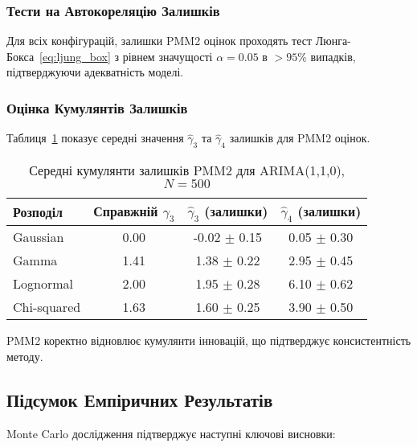\documentclass[12pt,a4paper]{article}
\begin{document}
	\subsubsection{Тести на Автокореляцію Залишків}
	
	Для всіх конфігурацій, залишки PMM2 оцінок проходять тест Люнга-Бокса~\eqref{eq:ljung_box} з рівнем значущості $\alpha = 0.05$ в $> 95\%$ випадків, підтверджуючи адекватність моделі.
	
	\subsubsection{Оцінка Кумулянтів Залишків}
	
	Таблиця~\ref{tab:residual_cumulants} показує середні значення $\hat{\gamma}_3$ та $\hat{\gamma}_4$ залишків для PMM2 оцінок.
	
	\begin{table}[h]
		\centering
		\caption{Середні кумулянти залишків PMM2 для ARIMA(1,1,0), $N=500$}
		\label{tab:residual_cumulants}
		\begin{tabular}{@{}lccc@{}}
			\toprule
			\textbf{Розподіл} & \textbf{Справжній $\gamma_3$} & \textbf{$\hat{\gamma}_3$ (залишки)} & \textbf{$\hat{\gamma}_4$ (залишки)} \\
			\midrule
			Gaussian    & 0.00 & -0.02 $\pm$ 0.15 & 0.05 $\pm$ 0.30 \\
			Gamma       & 1.41 & 1.38 $\pm$ 0.22 & 2.95 $\pm$ 0.45 \\
			Lognormal   & 2.00 & 1.95 $\pm$ 0.28 & 6.10 $\pm$ 0.62 \\
			Chi-squared & 1.63 & 1.60 $\pm$ 0.25 & 3.90 $\pm$ 0.50 \\
			\bottomrule
		\end{tabular}
	\end{table}
	
	PMM2 коректно відновлює кумулянти інновацій, що підтверджує консистентність методу.
	
	\subsection{Підсумок Емпіричних Результатів}
	\label{subsec:empirical_summary}
	
	Monte Carlo дослідження підтверджує наступні ключові висновки:
	
\end{document}
